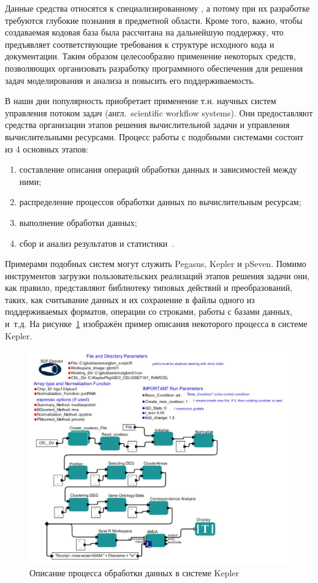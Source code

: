 Данные средства относятся к специализированному , а потому при их разработке требуются глубокие познания в предметной области. Кроме того, важно, чтобы создаваемая кодовая база была рассчитана на дальнейшую поддержку, что предъявляет соответствующие требования к структуре исходного кода и документации. Таким образом целесообразно применение некоторых средств, позволяющих организовать разработку программного обеспечения для решения задач моделирования и анализа и повысить его поддерживаемость.

В наши дни популярность приобретает применение т.н. научных систем управления потоком задач (англ.~scientific workflow systems). Они предоставляют средства организации этапов решения вычислительной задачи и управления вычислительными ресурсами. Процесс работы с подобными системами состоит из 4 основных этапов:
\begin{enumerate}[1)]
  \item составление описания операций обработки данных и зависимостей между ними;
  \item распределение процессов обработки данных по вычислительным ресурсам;
  \item выполнение обработки данных;
  \item сбор и анализ результатов и статистики~\cite{DeelmanWorkflow2009}.
\end{enumerate}

Примерами подобных систем могут служить Pegasus\cite{DeelmanPegasus2016}, Kepler\cite{AltintasKepler2004} и pSeven\cite{NazarenkoDFM2015}. Помимо инструментов загрузки пользовательских реализаций этапов решения задачи они, как правило, представляют библиотеку типовых действий и преобразований, таких, как считывание данных и их сохранение в файлы одного из поддерживаемых форматов, операции со строками, работы с базами данных, и~т.д. На рисунке~\ref{fig:intro.keplerScreenshot} изображён пример описания некоторого процесса в системе Kepler.
\begin{figure}[!ht]
  \centering
  \includegraphics[height=0.35\textheight]{figures/screenshot.KeplerWorkflow.jpg}
  \caption{Описание процесса обработки данных в системе Kepler}
  \label{fig:intro.keplerScreenshot}
\end{figure}


